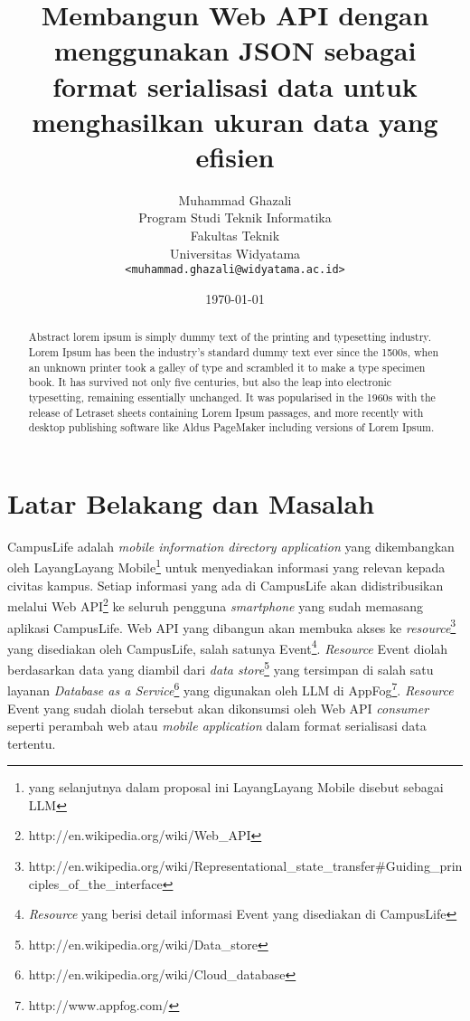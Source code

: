 \documentclass[a4paper, 12pt]{report}
\title{\textbf{Membangun Web API dengan menggunakan JSON sebagai format serialisasi data untuk menghasilkan ukuran data yang efisien}}
\author{
Muhammad Ghazali\\
Program Studi Teknik Informatika\\
Fakultas Teknik\\
Universitas Widyatama
\\ \texttt{<muhammad.ghazali@widyatama.ac.id>}
}
\date{\today}
\begin{document}
\maketitle

\onehalfspacing
\tableofcontents
\setcounter{tocdepth}{3}

\begin{abstract}
\onehalfspacing Abstract lorem ipsum is simply dummy text of the printing and typesetting industry. Lorem Ipsum has been the industry's standard dummy text ever since the 1500s, when an unknown printer took a galley of type and scrambled it to make a type specimen book. It has survived not only five centuries, but also the leap into electronic typesetting, remaining essentially unchanged. It was popularised in the 1960s with the release of Letraset sheets containing Lorem Ipsum passages, and more recently with desktop publishing software like Aldus PageMaker including versions of Lorem Ipsum.
\end{abstract}

\section*{Latar Belakang dan Masalah}
\onehalfspacing CampusLife adalah \textit{mobile information directory application} yang dikembangkan oleh LayangLayang Mobile\footnote{yang selanjutnya dalam proposal ini LayangLayang Mobile disebut sebagai LLM} untuk menyediakan informasi yang relevan kepada civitas kampus. Setiap informasi yang ada di CampusLife akan didistribusikan melalui Web API\footnote{http://en.wikipedia.org/wiki/Web\_API} ke seluruh pengguna \textit{smartphone} yang sudah memasang aplikasi CampusLife. Web API yang dibangun akan membuka akses ke \textit{resource}\footnote{http://en.wikipedia.org/wiki/Representational\_state\_transfer\#Guiding\_principles\_of\_the\_interface} yang disediakan oleh CampusLife, salah satunya Event\footnote{\textit{Resource} yang berisi detail informasi Event yang disediakan di CampusLife}. \textit{Resource} Event diolah berdasarkan data yang diambil dari \textit{data store}\footnote{http://en.wikipedia.org/wiki/Data\_store} yang tersimpan di salah satu layanan \textit{Database as a Service}\footnote{http://en.wikipedia.org/wiki/Cloud\_database} yang digunakan oleh LLM di AppFog\footnote{http://www.appfog.com/}. \textit{Resource} Event yang sudah diolah tersebut akan dikonsumsi oleh Web API \textit{consumer} seperti perambah web atau \textit{mobile application} dalam format serialisasi data tertentu.
\end{document}
